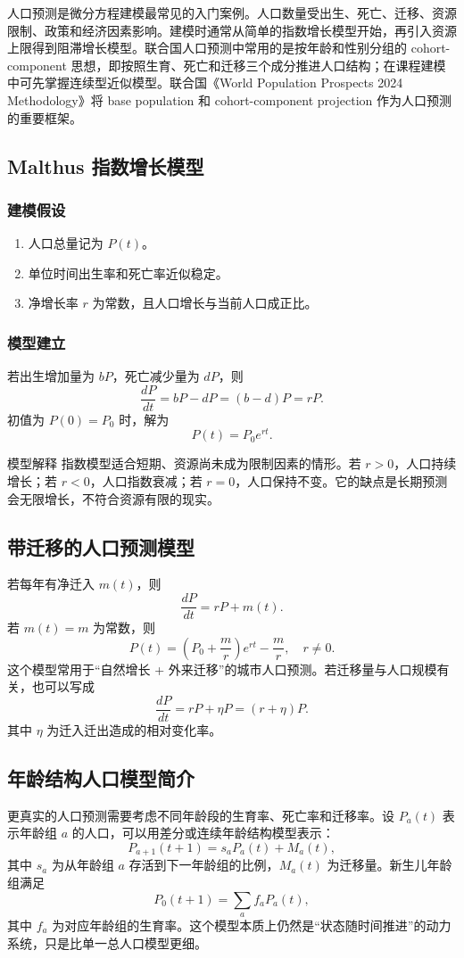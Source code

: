 \documentclass[11pt,a4paper]{ctexart}
\begin{document}
人口预测是微分方程建模最常见的入门案例。人口数量受出生、死亡、迁移、资源限制、政策和经济因素影响。建模时通常从简单的指数增长模型开始，再引入资源上限得到阻滞增长模型。联合国人口预测中常用的是按年龄和性别分组的 cohort-component 思想，即按照生育、死亡和迁移三个成分推进人口结构；在课程建模中可先掌握连续型近似模型。联合国《World Population Prospects 2024 Methodology》将 base population 和 cohort-component projection 作为人口预测的重要框架。

\subsection{Malthus 指数增长模型}
\subsubsection{建模假设}
\begin{enumerate}[itemsep=0.2em]
\item 人口总量记为 $P(t)$。
\item 单位时间出生率和死亡率近似稳定。
\item 净增长率 $r$ 为常数，且人口增长与当前人口成正比。
\end{enumerate}

\subsubsection{模型建立}
若出生增加量为 $bP$，死亡减少量为 $dP$，则
\[
\frac{dP}{dt}=bP-dP=(b-d)P=rP.
\]
初值为 $P(0)=P_0$ 时，解为
\[
P(t)=P_0 e^{rt}.
\]

\begin{notebox}{模型解释}
指数模型适合短期、资源尚未成为限制因素的情形。若 $r>0$，人口持续增长；若 $r<0$，人口指数衰减；若 $r=0$，人口保持不变。它的缺点是长期预测会无限增长，不符合资源有限的现实。
\end{notebox}

\subsection{带迁移的人口预测模型}
若每年有净迁入 $m(t)$，则
\[
\frac{dP}{dt}=rP+m(t).
\]
若 $m(t)=m$ 为常数，则
\[
P(t)=\left(P_0+\frac{m}{r}\right)e^{rt}-\frac{m}{r},\quad r\ne 0.
\]
这个模型常用于“自然增长 + 外来迁移”的城市人口预测。若迁移量与人口规模有关，也可以写成
\[
\frac{dP}{dt}=rP+\eta P=(r+\eta)P.
\]
其中 $\eta$ 为迁入迁出造成的相对变化率。

\subsection{年龄结构人口模型简介}
更真实的人口预测需要考虑不同年龄段的生育率、死亡率和迁移率。设 $P_a(t)$ 表示年龄组 $a$ 的人口，可以用差分或连续年龄结构模型表示：
\[
P_{a+1}(t+1)=s_a P_a(t)+M_a(t),
\]
其中 $s_a$ 为从年龄组 $a$ 存活到下一年龄组的比例，$M_a(t)$ 为迁移量。新生儿年龄组满足
\[
P_0(t+1)=\sum_a f_a P_a(t),
\]
其中 $f_a$ 为对应年龄组的生育率。这个模型本质上仍然是“状态随时间推进”的动力系统，只是比单一总人口模型更细。
\end{document}
